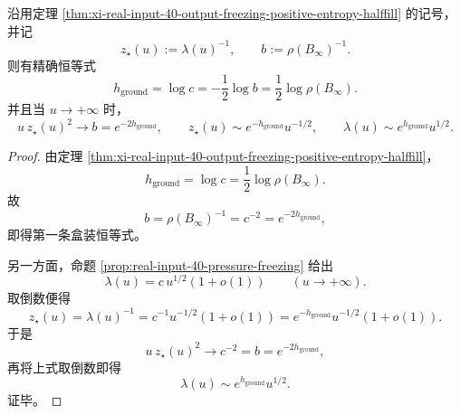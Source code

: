 \begin{theorem}\label{thm:xi-real-input-40-ground-entropy-endpoint-square-law}
沿用定理 \ref{thm:xi-real-input-40-output-freezing-positive-entropy-halffill} 的记号，并记
\[
z_\star(u):=\lambda(u)^{-1},
\qquad
b:=\rho(B_\infty)^{-1}.
\]
则有精确恒等式
\[
\boxed{\;
h_{\mathrm{ground}}
=
\log c
=
-\frac12\log b
=
\frac12\log\rho(B_\infty).\;}
\]
并且当 \(u\to+\infty\) 时，
\[
\boxed{\;
u\,z_\star(u)^2\to b=e^{-2h_{\mathrm{ground}}},
\qquad
z_\star(u)\sim e^{-h_{\mathrm{ground}}}u^{-1/2},
\qquad
\lambda(u)\sim e^{h_{\mathrm{ground}}}u^{1/2}.\;}
\]
\end{theorem}
\begin{proof}
由定理 \ref{thm:xi-real-input-40-output-freezing-positive-entropy-halffill}，
\[
h_{\mathrm{ground}}=\log c=\frac12\log\rho(B_\infty).
\]
故
\[
b=\rho(B_\infty)^{-1}=c^{-2}=e^{-2h_{\mathrm{ground}}},
\]
即得第一条盒装恒等式。

另一方面，命题 \ref{prop:real-input-40-pressure-freezing} 给出
\[
\lambda(u)=c\,u^{1/2}(1+o(1))
\qquad(u\to+\infty).
\]
取倒数便得
\[
z_\star(u)=\lambda(u)^{-1}=c^{-1}u^{-1/2}(1+o(1))
=
e^{-h_{\mathrm{ground}}}u^{-1/2}(1+o(1)).
\]
于是
\[
u\,z_\star(u)^2\to c^{-2}=b=e^{-2h_{\mathrm{ground}}},
\]
再将上式取倒数即得
\[
\lambda(u)\sim e^{h_{\mathrm{ground}}}u^{1/2}.
\]
证毕。
\end{proof}

\endinput

